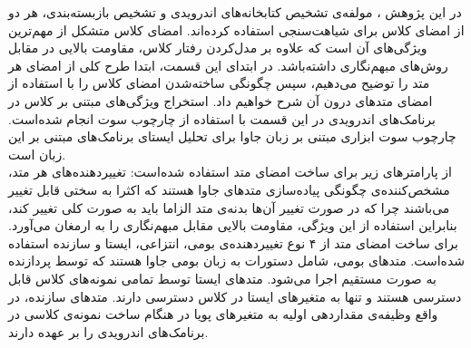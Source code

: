 در این پژوهش ، مولفه‌ی تشخیص کتابخانه‌های اندرویدی و تشخیص بازبسته‌بندی، هر دو از امضا‌ی کلاس برای شیاهت‌سنجی استفاده کرده‌اند. امضای کلاس‌ متشکل از مهم‌ترین ویژگی‌های آن است که علاوه بر مدل‌کردن رفتار کلاس، مقاومت بالایی در مقابل روش‌های مبهم‌نگاری داشته‌باشد. در ابتدای این قسمت، ابتدا طرح کلی از امضای هر متد را توضیح می‌دهیم، سپس چگونگی ساخته‌شدن امضا‌ی کلاس را با استفاده از امضای متد‌های درون آن شرح خواهیم داد. استخراج ویژگی‌های مبتنی بر کلاس در برنامک‌های اندرویدی در این قسمت با استفاده از چارچوب سوت انجام ‌شده‌است. چارچوب سوت ابزاری مبتنی بر زبان جاوا برای تحلیل ایستای برنامک‌های مبتنی بر این زبان است. \\
از پارامتر‌های زیر برای ساخت امضای متد استفاده شده‌است:
 تغییردهنده‌های هر متد، مشخص‌کننده‌ی چگونگی پیاده‌سازی متد‌های جاوا هستند که اکثرا به سختی قابل تغییر می‌باشند چرا که در صورت تغییر آن‌ها بدنه‌ی متد الزاما باید به صورت کلی تغییر کند، بنابراین استفاده از این ويژگی‌، مقاومت‌ بالایی مقابل مبهم‌نگاری را به ارمغان می‌آورد. برای ساخت امضای متد از ۴ نوع تغییردهنده‌ی بومی، انتزاعی، ایستا و سازنده استفاده شده‌است. متد‌های بومی، شامل دستورات به زبان بومی جاوا هستند که توسط پردازنده به صورت مستقیم اجرا می‌شود. متد‌های ایستا توسط تمامی نمونه‌های کلاس قابل دسترسی هستند و تنها به متغیر‌های ایستا در کلاس دسترسی دارند. متد‌های سازنده، در واقع وظیفه‌ی مقداردهی اولیه به متغیر‌های پویا در هنگام ساخت نمونه‌ی کلاسی در برنامک‌های اندرویدی را بر عهده دارند.

